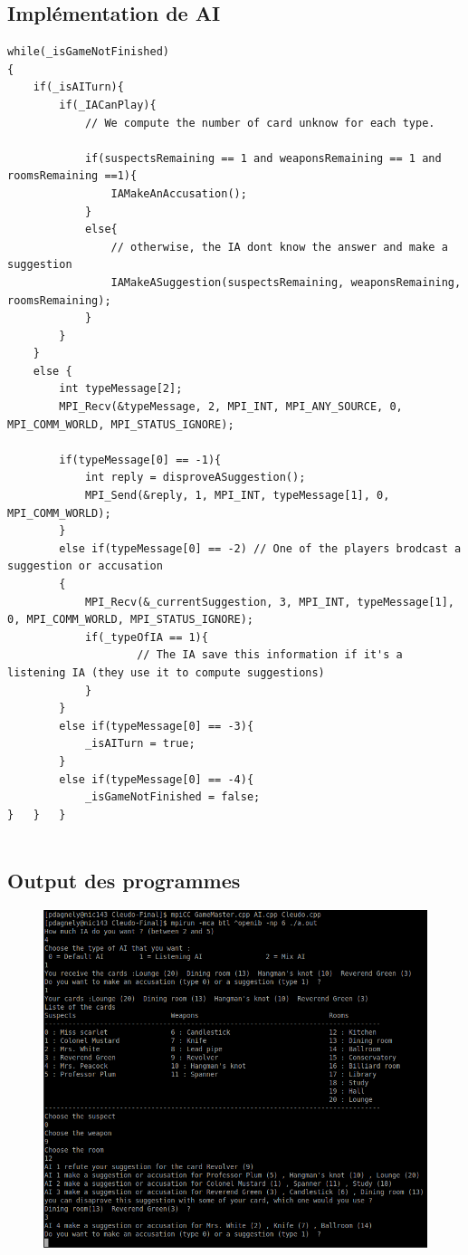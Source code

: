 \documentclass[a4paper,10pt]{article}
\begin{document}
	 
	 \subsection{Implémentation de AI} 	\hypertarget{AIimplementation}{}
	 
\begin{lstlisting}
while(_isGameNotFinished)
{
	if(_isAITurn){
		if(_IACanPlay){
			// We compute the number of card unknow for each type.
			
			if(suspectsRemaining == 1 and weaponsRemaining == 1 and roomsRemaining ==1){
				IAMakeAnAccusation();
			}
			else{
				// otherwise, the IA dont know the answer and make a suggestion
				IAMakeASuggestion(suspectsRemaining, weaponsRemaining, roomsRemaining);
			}
		}
	}
	else {
		int typeMessage[2];
		MPI_Recv(&typeMessage, 2, MPI_INT, MPI_ANY_SOURCE, 0, MPI_COMM_WORLD, MPI_STATUS_IGNORE);
			
		if(typeMessage[0] == -1){
			int reply = disproveASuggestion();
			MPI_Send(&reply, 1, MPI_INT, typeMessage[1], 0, MPI_COMM_WORLD);
		}
		else if(typeMessage[0] == -2) // One of the players brodcast a suggestion or accusation
		{	
			MPI_Recv(&_currentSuggestion, 3, MPI_INT, typeMessage[1], 0, MPI_COMM_WORLD, MPI_STATUS_IGNORE);
			if(_typeOfIA == 1){
					// The IA save this information if it's a listening IA (they use it to compute suggestions)
			}
		}
		else if(typeMessage[0] == -3){
			_isAITurn = true;
		}
		else if(typeMessage[0] == -4){
			_isGameNotFinished = false;	
}	}	}


\end{lstlisting}
\fontfamily{}
	  

	 \subsection{Output des programmes}
		\begin{figure}[H] \hspace*{-2cm} 
    	\centering
   		  \includegraphics[width=350pt]{output.png} 
	  	\end{figure}
\end{document}
